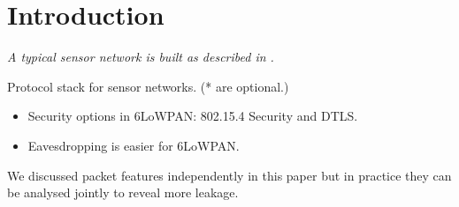 \section{Introduction}
{\it
A typical sensor network is built as described in .

\begin{table}[!h]
	\centering
	
	\caption{Protocol stack for sensor networks. (* are optional.)\label{Protocols}}
\end{table}


\begin{itemize}
	\item Security options in 6LoWPAN: 802.15.4 Security and DTLS.
	\item Eavesdropping is easier for 6LoWPAN.
\end{itemize}

We discussed packet features independently in this paper but in practice they can be analysed jointly to reveal more leakage.
}